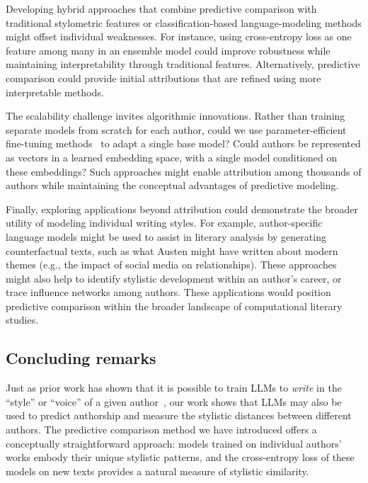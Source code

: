 \documentclass[11pt]{article}
\begin{document}
Developing hybrid approaches that combine predictive comparison with
traditional stylometric features or classification-based language-modeling
methods might offset individual weaknesses. For instance, using cross-entropy
loss as one feature among many in an ensemble model could improve robustness
while maintaining interpretability through traditional features. Alternatively,
predictive comparison could provide initial attributions that are refined using
more interpretable methods.

The scalability challenge invites algorithmic innovations. Rather than training
separate models from scratch for each author, could we use parameter-efficient
fine-tuning methods~\citep{HoulEtal19} to adapt a single base model? Could
authors be represented as vectors in a learned embedding space, with a single
model conditioned on these embeddings? Such approaches might enable attribution
among thousands of authors while maintaining the conceptual advantages of
predictive modeling.

Finally, exploring applications beyond attribution could demonstrate the
broader utility of modeling individual writing styles. For example,
author-specific language models might be used to assist in literary analysis by
generating counterfactual texts, such as what Austen might have written about
modern themes (e.g., the impact of social media on relationships). These
approaches might also help to identify stylistic development within an author's
career, or trace influence networks among authors. These applications would
position predictive comparison within the broader landscape of computational
literary studies.

\subsection{Concluding remarks}

Just as prior work has shown that it is possible to train LLMs to
\textit{write} in the ``style'' or ``voice'' of a given author~\citep[see
e.g.,][]{Mikr25}, our work shows that LLMs may also be used to predict
authorship and measure the stylistic distances between different authors. The
predictive comparison method we have introduced offers a conceptually
straightforward approach: models trained on individual authors' works embody
their unique stylistic patterns, and the cross-entropy loss of these models on
new texts provides a natural measure of stylistic similarity.
\end{document}
